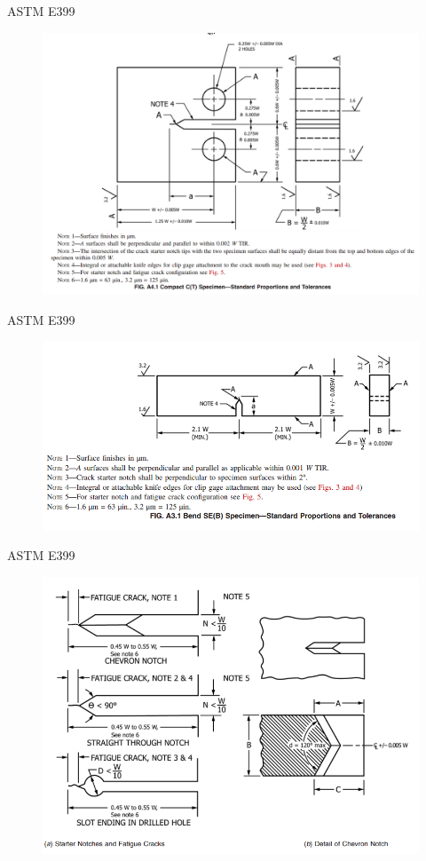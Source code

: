 \documentclass[10pt]{beamer}
\begin{document}
\begin{frame}{ASTM E399}
	\begin{figure}
	\centering
	\includegraphics[width=0.7\linewidth]{CT}
	\label{fig:CT}
	\end{figure}
\end{frame}

\begin{frame}{ASTM E399}
	\begin{figure}
	\centering
	\includegraphics[width=0.7\linewidth]{SENB}
	\label{fig:SENB}
	\end{figure}
\end{frame}

\begin{frame}{ASTM E399}
	\begin{figure}
	\centering
	\includegraphics[width=0.7\linewidth]{chevron}
	\label{fig:chevron}
	\end{figure}
\end{frame}
\end{document}
